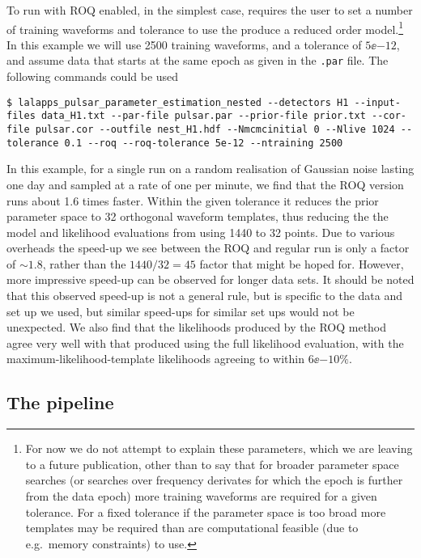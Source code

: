 To run with ROQ enabled, in the simplest case, requires the user to set a number of training waveforms and tolerance to use the produce a reduced order
model.\footnote{For now we do not attempt to explain these parameters, which we are leaving to a future publication, other than to say that for broader
parameter space searches (or searches over frequency derivates for which the epoch is further from the data epoch) more training waveforms are required
for a given tolerance. For a fixed tolerance if the parameter space is too broad more templates may be required than are computational feasible (due to e.g.\
memory constraints) to use.} In this example we will use 2500 training waveforms, and a tolerance of $5\ee{-12}$, and assume data that starts at the same
epoch as given in the {\tt .par} file. The following commands could be used
\begin{lstlisting}[frame=single]
$ lalapps_pulsar_parameter_estimation_nested --detectors H1 --input-files data_H1.txt --par-file pulsar.par --prior-file prior.txt --cor-file pulsar.cor --outfile nest_H1.hdf --Nmcmcinitial 0 --Nlive 1024 --tolerance 0.1 --roq --roq-tolerance 5e-12 --ntraining 2500
\end{lstlisting}

In this example, for a single run on a random realisation of Gaussian noise lasting one day and sampled at a rate of one per minute, we find that the ROQ
version runs about 1.6 times faster. Within the given tolerance it reduces the prior parameter space to 32 orthogonal waveform templates, thus reducing the
the model and likelihood evaluations from using 1440 to 32 points. Due to various overheads the speed-up we see between the ROQ and regular run is only a factor
of $\sim 1.8$, rather than the $1440/32 = 45$ factor that might be hoped for. However, more impressive speed-up can be observed for longer data sets. It should be
noted that this observed speed-up is not a general rule, but is specific to the data and set up we used, but similar speed-ups for similar set ups would not be
unexpected. We also find that the likelihoods produced by the ROQ method agree very well with that produced using the full likelihood evaluation, with the
maximum-likelihood-template likelihoods agreeing to within $6\ee{-10}\%$.

\subsection{The pipeline}

